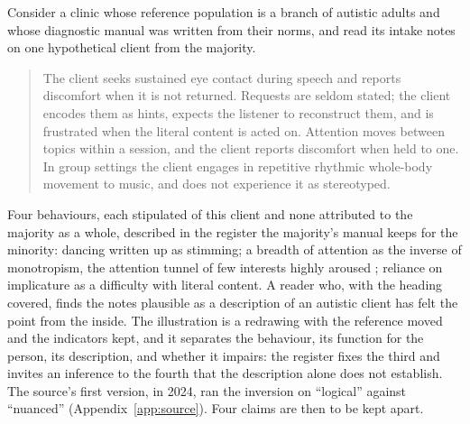 Consider a clinic whose reference population is a branch of autistic adults and whose diagnostic manual was written from their norms, and read its intake notes on one hypothetical client from the majority.
\begin{quote}
The client seeks sustained eye contact during speech and reports discomfort when it is not returned. Requests are seldom stated; the client encodes them as hints, expects the listener to reconstruct them, and is frustrated when the literal content is acted on. Attention moves between topics within a session, and the client reports discomfort when held to one. In group settings the client engages in repetitive rhythmic whole-body movement to music, and does not experience it as stereotyped.
\end{quote}
Four behaviours, each stipulated of this client and none attributed to the majority as a whole, described in the register the majority's manual keeps for the minority: dancing written up as stimming; a breadth of attention as the inverse of monotropism, the attention tunnel of few interests highly aroused \cite{Murray2005}; reliance on implicature as a difficulty with literal content. A reader who, with the heading covered, finds the notes plausible as a description of an autistic client has felt the point from the inside. The illustration is a redrawing with the reference moved and the indicators kept, and it separates the behaviour, its function for the person, its description, and whether it impairs: the register fixes the third and invites an inference to the fourth that the description alone does not establish. The source's first version, in 2024, ran the inversion on ``logical'' against ``nuanced'' (Appendix~\ref{app:source}). Four claims are then to be kept apart.
